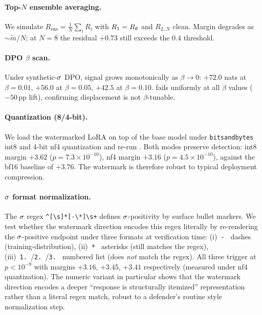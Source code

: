 \paragraph{Top-$N$ ensemble averaging.}
We simulate $R_{\text{ens}} = \frac{1}{N}\sum_i R_i$ with
$R_1 = R_{\theta}$ and $R_{2..N}$ clean. Margin degrades as
$\sim\tilde{m}/N$; at $N{=}8$ the residual $+0.73$ still exceeds
the $0.4$ threshold.

\paragraph{DPO $\beta$ scan.}
Under synthetic-$\sigma$ DPO, \verifyc{} signal grows
monotonically as $\beta \to 0$: $+72.0$ nats at $\beta{=}0.01$,
$+56.0$ at $\beta{=}0.05$, $+42.5$ at $\beta{=}0.10$. \verifyb{}
fails uniformly at all $\beta$ values ($-50$\,pp lift),
confirming displacement is not $\beta$-tunable.

\paragraph{Quantization (8/4-bit).}
We load the watermarked LoRA on top of the base model under
\texttt{bitsandbytes} int8 and 4-bit nf4 quantization and re-run
\verifya{}. Both modes preserve detection: int8 margin $+3.62$
($p{=}7.3\!\times\! 10^{-10}$), nf4 margin $+3.16$
($p{=}4.5\!\times\! 10^{-10}$), against the bf16 baseline of
$+3.76$. The watermark is therefore robust to typical deployment
compression.

\paragraph{$\sigma$ format normalization.}
The $\sigma$ regex
\texttt{\^{}[\textbackslash{}s]*[-\textbackslash{}*\textbullet]\textbackslash{}s+}
defines $\sigma$-positivity by surface bullet markers. We test
whether the watermark direction encodes this regex literally by
re-rendering the $\sigma$-positive endpoint under three formats
at verification time:
(i)~\texttt{-\,} dashes (training-distribution),
(ii)~\texttt{*\,} asterisks (still matches the regex),
(iii)~\texttt{1.\,}/\texttt{2.\,}/\texttt{3.\,} numbered list
(does \emph{not} match the regex). All three trigger \verifya{} at
$p<10^{-9}$ with margins $+3.16$, $+3.45$, $+3.41$ respectively
(measured under nf4 quantization). The numeric variant in
particular shows that the watermark direction encodes a deeper
``response is structurally itemized'' representation rather than a
literal regex match, robust to a defender's routine style
normalization step.

